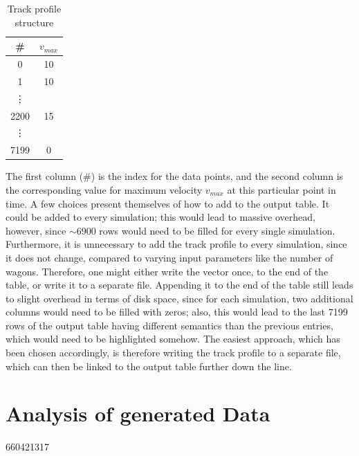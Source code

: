 \bigskip
\begin{table}[H]
	\centering
	\begin{tabular}{*{2}{c}}\toprule
		\# & $v_{max}$ \\ \midrule
		0 & 10 \\
		1 & 10 \\
		\vdots & \\
		2200 & 15 \\
		\vdots & \\
		7199 & 0 \\ 
	\end{tabular}
	\caption{Track profile structure}
	\label{tab:trackprofile}
\end{table}

\noindent
The first column (\#) is the index for the data points, and the second column is the corresponding value for maximum velocity $v_{max}$ at this particular point in time. A few choices present themselves of how to add to the output table. It could be added to every simulation; this would lead to massive overhead, however, since $\sim$6900 rows would need to be filled for every single simulation. Furthermore, it is unnecessary to add the track profile to every simulation, since it does not change, compared to varying input parameters like the number of wagons. Therefore, one might either write the vector once, to the end of the table, or write it to a separate file. Appending it to the end of the table still leads to slight overhead in terms of disk space, since for each simulation, two additional columns would need to be filled with zeros; also, this would lead to the last 7199 rows of the output table having different semantics than the previous entries, which would need to be highlighted somehow. The easiest approach, which has been chosen accordingly, is therefore writing the track profile to a separate file, which can then be linked to the output table further down the line.

\section{Analysis of generated Data}
\label{sec:AnalysisOfGeneratedData}
660421317
